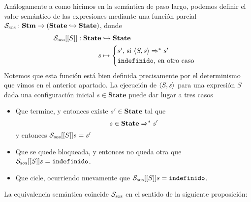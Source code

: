 Análogamente a como hicimos en la semántica de paso largo, podemos definir el valor semántico de las expresiones mediante una función parcial $\mathcal{S}_{\mathrm{sos}}: \mathbf{Stm}\rightarrow (\mathbf{State}\hookrightarrow\mathbf{State})$, donde
\begin{align*}
    \mathcal{S}_{\mathrm{sos}}[[S]]:  \mathbf{State} & \hookrightarrow  \mathbf{State} \\
                     s               & \mapsto          \begin{cases} s' \text{, si } \langle S, s \rangle\Rightarrow^* s' \\ 
                        \texttt{indefinido} \text{, en otro caso}
                        \end{cases}
\end{align*}
Notemos que esta función está bien definida precisamente por el determinismo que vimos en el anterior apartado. La ejecución de $\langle S, s \rangle$ para una expresión $S$ dada una configuración inicial $s\in\textbf{State}$ puede dar lugar a tres casos
\begin{itemize}
    \item Que termine, y entonces existe $s'\in\textbf{State}$ tal que
    \[
        s\in\textbf{State} \Rightarrow^* s'
    \]
    y entonces $\mathcal{S}_{\mathrm{sos}}[[S]]s = s'$
    \item Que se quede bloqueada, y entonces no queda otra que $\mathcal{S}_{\mathrm{sos}}[[S]]s = \texttt{indefinido}$.
    \item Que cicle, ocurriendo nuevamente que $\mathcal{S}_{\mathrm{sos}}[[S]]s = \texttt{indefinido}$.
\end{itemize} 
La equivalencia semántica coincide $\mathcal{S}_{\mathrm{sos}}$ en el sentido de la siguiente proposición: \\

